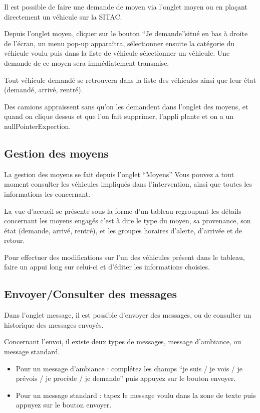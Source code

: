 \documentclass{article}
\begin{document}
Il est possible de faire une demande de moyen via l'onglet moyen 
ou en plaçant directement un véhicule sur la SITAC.

Depuis l'onglet moyen, cliquer sur le bouton ``Je demande''situé 
en bas à droite de l'écran, un menu pop-up apparaîtra, sélectionner ensuite 
la catégorie du véhicule voulu puis dans la liste de véhicule sélectionner 
un véhicule. Une demande de ce moyen sera immédiatement transmise.

Tout véhicule demandé se retrouvera dans la liste des véhicules 
ainsi que leur état (demandé, arrivé, rentré).

Des camions appraissent sans qu'on les demandent dans l'onglet 
des moyens, et quand on clique dessus et que l'on fait supprimer, l'appli plante 
et on a un nullPointerExpection.


\subsection{Gestion des moyens }

La gestion des moyens se fait depuis l'onglet ``Moyens'' Vous 
pouvez a tout moment consulter les véhicules impliqués dans l'intervention, ainsi 
que toutes les informations les concernant.

La vue d'accueil se présente sous la forme d'un tableau regroupant 
les détails concernant les moyens engagés c'est à dire le type du moyen, sa 
provenance, son état (demande, arrivé, rentré), et les groupes horaires d'alerte, 
d'arrivée et de retour.

Pour effectuer des modifications sur l'un des véhicules présent 
dans le tableau, faire un appui long sur celui-ci et d'éditer les informations 
choisies.


\subsection{Envoyer/Consulter des messages}

Dans l'onglet message, il est possible d'envoyer des messages, 
ou de consulter un historique des messages envoyés.

Concernant l'envoi, il existe deux types de messages, message 
d'ambiance, ou message standard.

\begin{itemize}
\item Pour un message d'ambiance : complétez les champs ``je suis 
/ je vois / je prévois / je procède / je demande'' puis appuyez sur le bouton 
envoyer.

\item Pour un message standard : tapez le message voulu dans la zone 
de texte puis appuyez sur le bouton envoyer.
\end{itemize}
\end{document}
